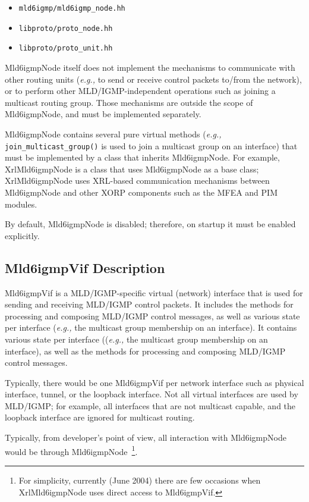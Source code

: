 \documentclass[11pt]{article}
\newcommand{\eg}{\emph{e.g.,}\xspace}
\begin{document}
\begin{itemize}
  \item \verb=mld6igmp/mld6igmp_node.hh=
  \item \verb=libproto/proto_node.hh=
  \item \verb=libproto/proto_unit.hh=
\end{itemize}

Mld6igmpNode itself does not implement the mechanisms to communicate with
other routing units (\eg to send or receive control packets to/from the
network), or to perform other MLD/IGMP-independent operations such as
joining a multicast routing group. Those mechanisms are outside the scope of
Mld6igmpNode, and must be implemented separately.

Mld6igmpNode contains several pure virtual methods (\eg
\verb=join_multicast_group()= is used to join a multicast group on
an interface) that must be implemented by a class that inherits Mld6igmpNode.
For example, XrlMld6igmpNode is a class that uses Mld6igmpNode as a base
class; XrlMld6igmpNode uses XRL-based communication mechanisms between
Mld6igmpNode and other XORP components such as the MFEA and PIM modules.

By default, Mld6igmpNode is disabled; therefore, on startup it must be
enabled explicitly.

\subsection{Mld6igmpVif Description}

Mld6igmpVif is a MLD/IGMP-specific virtual (network) interface that is
used for sending and receiving MLD/IGMP control packets. It includes the
methods for processing and composing MLD/IGMP control messages, as well
as various state per interface (\eg the multicast group membership on an
interface). It contains various state per interface ((\eg the multicast
group membership on an interface), as well as the methods for processing
and composing MLD/IGMP control messages.

Typically, there would be one Mld6igmpVif per network interface
such as physical interface, tunnel, or the loopback
interface. Not all virtual interfaces are
used by MLD/IGMP; for example, all interfaces that are not multicast
capable, and the loopback interface are ignored for multicast
routing.

Typically, from developer's point of view, all interaction with Mld6igmpNode
would be through Mld6igmpNode~\footnote{For simplicity, currently
(June 2004) there are few occasions when XrlMld6igmpNode uses
direct access to Mld6igmpVif.}.
\end{document}
